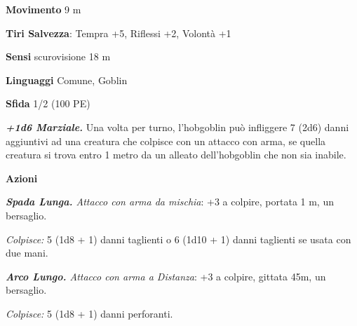 \begin{multicols}{2}
\textbf{Movimento} 9 m

\textbf{Tiri Salvezza}: Tempra +5, Riflessi +2, Volontà +1

\textbf{Sensi} scurovisione 18 m

\textbf{Linguaggi} Comune, Goblin

\textbf{Sfida} 1/2 (100 PE)

\emph{\textbf{+1d6 Marziale.}} Una volta per turno, l'hobgoblin può infliggere 7 (2d6) danni aggiuntivi ad una creatura che colpisce con un attacco con arma, se quella creatura si trova entro 1 metro da un alleato dell'hobgoblin che non sia inabile.

\textbf{Azioni}

\emph{\textbf{Spada Lunga.} Attacco con arma da mischia}: +3 a colpire, portata 1 m, un bersaglio.

\emph{Colpisce:} 5 (1d8 + 1) danni taglienti o 6 (1d10 + 1) danni taglienti se usata con due mani.

\emph{\textbf{Arco Lungo.} Attacco con arma a Distanza}: +3 a colpire, gittata 45m, un bersaglio.

\emph{Colpisce:} 5 (1d8 + 1) danni perforanti.


\end{multicols}
